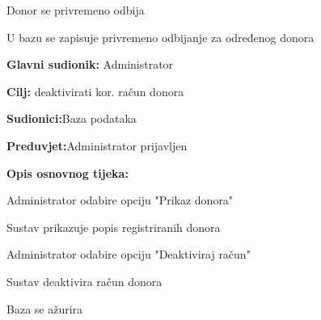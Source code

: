 \begin{packed_item}
\begin{packed_item}
\begin{packed_enum}
			\item Donor se privremeno odbija
			\item U bazu se zapisuje privremeno odbijanje za određenog donora
			\end{packed_enum}
		
		
	\end{packed_item}
	
\end{packed_item}
\eject 

\noindent {}
\begin{packed_item}
	
	\item \textbf{Glavni sudionik: }{Administrator}
	\item  \textbf{Cilj:} {deaktivirati kor. račun donora}
	\item  \textbf{Sudionici:}{Baza podataka}
	\item  \textbf{Preduvjet:}{Administrator prijavljen}
	\item  \textbf{Opis osnovnog tijeka:}
	
	\item[] \begin{packed_enum}
		
		\item {Administrator odabire opciju "Prikaz donora"}
		\item {Sustav prikazuje popis registriranih donora} 
		\item {Administrator odabire opciju "Deaktiviraj račun"}
		\item {Sustav deaktivira račun donora}
		\item {Baza se ažurira}
	\end{packed_enum}
	
\end{packed_item}


\noindent {}

